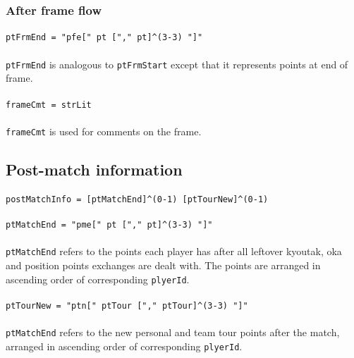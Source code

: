 \documentclass[%
	a4paper%
	,10pt%
	,twoside%
	,notitlepage%
]{article}%
\newcommand*{\ruleSymbol}{\textjapanese{⚠}}%
\newcommand*{\ruleMargin}{\marginpar{\flushright{}\ruleSymbol{}}}%
\newcommand*{\rulePar}{\paragraph*{\ruleMargin{}}}%
\begin{document}
		\subsubsection{After frame flow}\label{subsubsec:postfrmflow}%
			\rulePar{}\lstinline/ptFrmEnd = "pfe[" pt ["," pt]^(3-3) "]"/%
			\paragraph*{}\lstinline/ptFrmEnd/ is analogous to \lstinline/ptFrmStart/ except that it represents points at end of frame. %
			\rulePar{}\lstinline/frameCmt = strLit/%
			\paragraph*{}\lstinline/frameCmt/ is used for comments on the frame. %
	\subsection{Post-match information}%
		\rulePar{}\lstinline/postMatchInfo = [ptMatchEnd]^(0-1) [ptTourNew]^(0-1)/%
		\rulePar{}\lstinline/ptMatchEnd = "pme[" pt ["," pt]^(3-3) "]"/%
		\paragraph*{}\lstinline/ptMatchEnd/ refers to the points each player has after all leftover kyoutak, oka and position points exchanges are dealt with. The points are arranged in ascending order of corresponding \lstinline/plyerId/. %
		\rulePar{}\lstinline/ptTourNew = "ptn[" ptTour ["," ptTour]^(3-3) "]"/%
		\paragraph*{}\lstinline/ptMatchEnd/ refers to the new personal and team tour points after the match, arranged in ascending order of corresponding \lstinline/plyerId/. %
\end{document}
